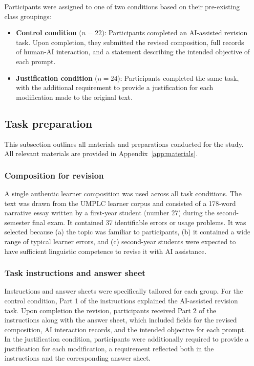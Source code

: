\documentclass[english]{textolivre}
\begin{document}
Participants were assigned to one of two conditions based on their pre-existing class groupings:

\begin{itemize}
\item \textbf{Control condition} ($n = 22$): Participants completed an AI-assisted revision task. Upon completion, they submitted the revised composition, full records of human-AI interaction, and a statement describing the intended objective of each prompt.

\item \textbf{Justification condition} ($n = 24$): Participants completed the same task, with the additional requirement to provide a justification for each modification made to the original text. 

\end{itemize}

\subsection{Task preparation}\label{3.2}

This subsection outlines all materials and preparations conducted for the study. All relevant materials are provided in Appendix~\ref{app:materials}.

\subsubsection{Composition for revision}

A single authentic learner composition was used across all task conditions. The text was drawn from the UMPLC learner corpus \cite{you2025umplc} and consisted of a 178-word narrative essay written by a first-year student (number 27) during the second-semester final exam. It contained 37 identifiable errors or usage problems. 
It was selected because (a) the topic was familiar to participants, (b) it contained a wide range of typical learner errors, and (c) second-year students were expected to have sufficient linguistic competence to revise it with AI assistance.

\subsubsection{Task instructions and answer sheet}

Instructions and answer sheets were specifically tailored for each group. For the control condition, Part 1 of the instructions explained the AI-assisted revision task. Upon completion the revision, participants received Part 2 of the instructions along with the answer sheet, which included fields for the revised composition, AI interaction records, and the intended objective for each prompt. In the justification condition, participants were additionally required to provide a justification for each modification, a requirement reflected both in the instructions and the corresponding answer sheet.
\end{document}
